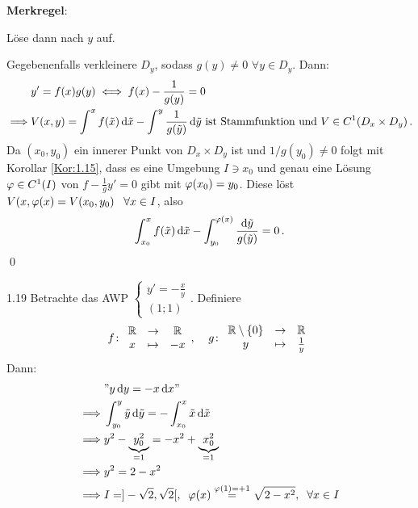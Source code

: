 \documentclass[a4paper]{article}
\begin{document}
\textbf{Merkregel}:
\begin{center}
\end{center}
Löse dann nach $y$ auf.

\begin{Beweis}
Gegebenenfalls verkleinere $D_y$, sodass $g(y)\ne0$ $\forall y\in D_y$. Dann:
\begin{align*}
&y'=f(x)g(y)\iff f(x)-\frac{1}{g(y)}=0\\
\implies & V(x,y)=\int^xf(\tilde{x})\mathop{}\!\mathrm{d}\tilde{x}-\int^y\frac{1}{g(\tilde{y})}\mathop{}\!\mathrm{d} \tilde{y}\text{ ist Stammfunktion und }V\in C^1(D_x\times D_y)\,.
\end{align*}
Da $(x_0,y_0)$ ein innerer Punkt von $D_x\times D_y$ ist und $1/g(y_0)\ne 0$ folgt mit Korollar \ref{Kor:1.15}, dass es eine Umgebung $I\ni x_0$ und genau eine Lösung $\operatorname{\varphi}\in C^1(I)$ von $f-\frac{1}{g}y'=0$ gibt mit $\operatorname{\varphi}(x_0)=y_0$. Diese löst $V(x,\operatorname{\varphi}(x)=V(x_0,y_0)\;\;\;\forall x\in I$, also
\[\int_{x_0}^xf(\tilde{x})\mathop{}\!\mathrm{d} \tilde{x}-\int_{y_0}^{\operatorname{\varphi}(x)}\frac{\mathop{}\!\mathrm{d} \tilde{y}}{g(\tilde{y})}=0\,.\]
\qed
\end{Beweis}

\begin{Beispiel}{}{1.19}
Betrachte das AWP $\left\{\begin{array}{c}
y'=-\frac{x}{y}\\(1;1)
\end{array} \right.$. Definiere
\[f\colon\begin{array}{clc}
\mathbb R&\to&\mathbb R\\
x&\mapsto& -x
\end{array},\;\;\;\;
g\colon\begin{array}{clc}
\mathbb R\setminus\{0\}&\to&\mathbb R\\
y&\mapsto& \frac{1}{y}
\end{array}\]
Dann:
\begin{align*}
&"{}y\mathop{}\!\mathrm{d} y=-x\mathop{}\!\mathrm{d} x"{}\\
\implies& \int_{y_0}^y\tilde{y}\mathop{}\!\mathrm{d} \tilde{y}=-\int_{x_0}^x\tilde{x}\mathop{}\!\mathrm{d} \tilde{x}\\
\implies& y^2-\underbrace{y_0^2}_{=1}=-x^2+\underbrace{x_0^2}_{=1}\\
\implies & y^2=2-x^2\\
\implies & I=]-\sqrt2,\sqrt2[,\;\;\operatorname{\varphi}(x)\overset{\operatorname{\varphi}(1)=+1}{=}\sqrt{2-x^2}, \;\;\forall x\in I
\end{align*}
\end{Beispiel}
\end{document}

